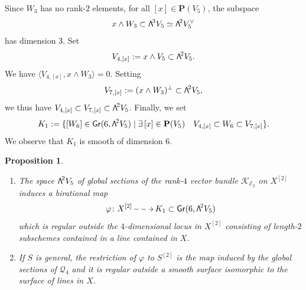 \documentclass[11pt]{article}
\makeatletter
\newcommand{\skpt}{\smallskip}
\let\mathcal\mathscr
\newenvironment{enumeratea}
{\bgroup\def\theenumi{\alph{enumi}}\def\theenumii{\arabic{enumii}}\begin{enumerate}}
{\end{enumerate}\egroup}
\newcommand{\dradpl}{{\!\!\xymatrix@C=8mm{\ar@{-->}[r]&}\!\!}}
\newcommand{\dratst}{{\,\mathrel{\scalebox{.8}{$\dradpl$}}\,}}
\newcommand{\drascst}{{\,\mathrel{\scalebox{.6}{$\dradpl$}}\,}}
\newcommand{\dra}{\mathchoice{\dradpl}{\dratst}{\drascst}{\drascst}}
\newtheorem{prop}[lemm]{Proposition}
\theoremstyle{definition}
\renewcommand\P{{\mathbf P}}\let\PP\P
\newcommand\cE{\mathcal{E}}
\newcommand\cK{\mathcal{K}}
\newcommand\cQ{\mathcal{Q}}\let\quotauto\cQ
\DeclareMathOperator{\Gr}{\mathsf{Gr}}
\let\phi\varphi
\let\cong\simeq
\let\dual\vee
\newcommand\bw[1]{{\hbox{\large$\mathsf{\Lambda}$}^{\!#1}}}
\newcommand\hilbS{S^{[2]}}
\renewcommand{\dratst}{\mathrel{\scalebox{.8}{$\dradpl$}}}
\renewcommand{\drascst}{\mathrel{\scalebox{.6}{$\dradpl$}}}
\makeatother
\begin{document}
Since $W_3$ has no rank-$2$ elements, for all
$[x]\in \P(V_5)$, the subspace
\[
x\wedge W_3\subset \bw3V_5\cong \bw2 V_5^\dual
\]
has dimension $3$. Set
\[
V_{4,[x]}:=x\wedge V_5\subset \bw2 V_5.
\]
We have
$\langle V_{4,[x]},x\wedge W_3\rangle=0$.
Setting
\[
V_{7,[x]} :=(x\wedge W_3)^\perp\subset \bw2 V_5,
\]
we thus have
$V_{4,[x]}\subset V_{7,[x]}\subset \bw2 V_5$.
Finally, we set
\begin{equation}\label{defk1}
K_1:=\{ [W_6]\in \Gr(6,\bw2 V_5)\mid \exists\, [x]\in \P(V_5)\quad V_{4,[x]}\subset W_6\subset V_{7,[x]}\}.
\end{equation}
We observe that $K_1$ is smooth of dimension $6$.

\skpt
\begin{prop} \label{propbirat}
\begin{enumeratea}
\item\label{propbirata}
The space $\bw2 V_5$ of global sections of the rank-$4$ vector bundle $ \cK_{\cE_2} $ on $ X^{[2]}$ induces a
birational map
\[
\phi\colon X^{[2]}\dra K_1\subset \Gr(6,\bw2 V_5)
\]
which is regular outside the $4$-dimensional locus in $ X^{[2]}$ consisting of length-$2$ subschemes
contained in a line contained in $X$.

\item\label{propbiratb}
If $S$ is general, the restriction of $\phi$ to $\hilbS$ is the map induced by the global sections of $\cQ_4$ and it is regular outside a smooth surface isomorphic to the surface of lines in $X$.
\end{enumeratea}
\end{prop}
\end{document}
